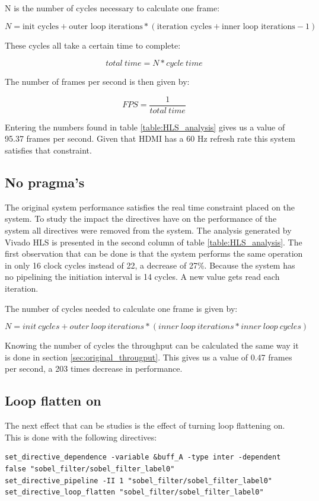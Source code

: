\documentclass[a4paper]{report}
\begin{document}
N is the number of cycles necessary to calculate one frame:


\[
N =  \text{init cycles} + \text{outer loop iterations} * ( \text{iteration cycles} + \text{inner loop iterations} - 1)
\]


These cycles all take a certain time to complete:

\[
total\ time = N * cycle\ time
\]

The number of frames per second is then given by:

\[
FPS = \frac{1}{total\ time}
\]

Entering the numbers found in table \ref{table:HLS_analysis} gives us a value of 95.37 frames per second. Given that HDMI has a 60 Hz refresh rate this system satisfies that constraint.


\subsection{No pragma's}

The original system performance satisfies the real time constraint placed on the system. To study the impact the directives have on the performance of the system all directives were removed from the  system. The analysis generated by Vivado HLS is presented in the second column of table \ref{table:HLS_analysis}. The first observation that can be done is that the system performs the same operation in only 16 clock cycles instead of 22, a decrease of 27\%. Because the system has no pipelining the initiation interval is 14 cycles. A new value gets read each iteration.

The number of cycles needed to calculate one frame is given by:

\[
N = init\ cycles + outer\ loop\ iterations * (inner\ loop\ iterations * inner\ loop\ cycles) 
\]


Knowing the number of cycles the throughput can be calculated the same way it is done in section \ref{sec:original_througput}. This gives us a value of 0.47 frames per second, a 203 times decrease in performance.

\subsection{Loop flatten on}

The next effect that can be studies is the effect of turning loop flattening on. This is done with the following directives:

\begin{scriptsize}
\begin{verbatim}
set_directive_dependence -variable &buff_A -type inter -dependent false "sobel_filter/sobel_filter_label0"
set_directive_pipeline -II 1 "sobel_filter/sobel_filter_label0"
set_directive_loop_flatten "sobel_filter/sobel_filter_label0"
\end{verbatim}
\end{scriptsize}
\end{document}
